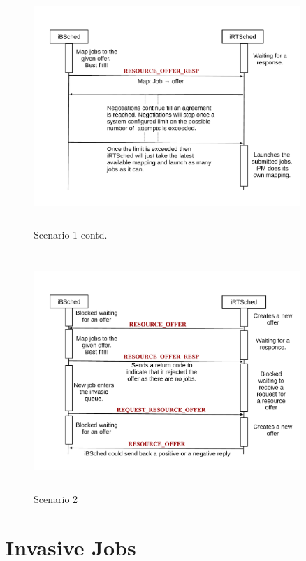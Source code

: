 \begin{figure}[!t]
\vspace{-0.25in}
\centering
\includegraphics[width=0.9\textwidth, height=90mm]{./figures/scenario1contd.pdf}
\caption{Scenario 1 contd.}
\label{fig:Seq2}
\end{figure}
\begin{figure}[!b]
\centering
\includegraphics[width=0.9\textwidth, height=90mm]{./figures/scenario2.pdf}
\caption{Scenario 2}
\label{fig:Seq3}
\end{figure}
\section{Invasive Jobs}
